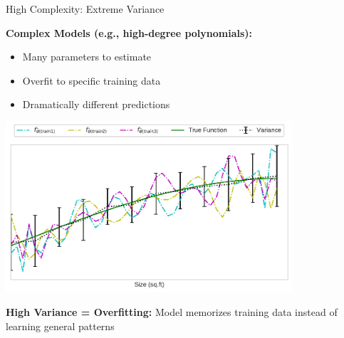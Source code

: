 \documentclass[10pt]{beamer}
\newcommand{\fitpic}[1]{\begin{adjustbox}{max width=\linewidth, max totalheight=0.78\textheight}#1\end{adjustbox}}
\begin{document}
\begin{frame}{High Complexity: Extreme Variance}
\begin{keypointsbox}
\textbf{Complex Models (e.g., high-degree polynomials):}
\begin{itemize}
\item Many parameters to estimate
\item Overfit to specific training data
\item Dramatically different predictions
\end{itemize}
\end{keypointsbox}

\begin{center}
\fitpic{\includegraphics[width=0.8\textwidth]{../assets/bias-variance/figures/var4.pdf}}
\end{center}

\begin{alertbox}
\textbf{High Variance = Overfitting:} Model memorizes training data instead of learning general patterns
\end{alertbox}
\end{frame}
\end{document}

